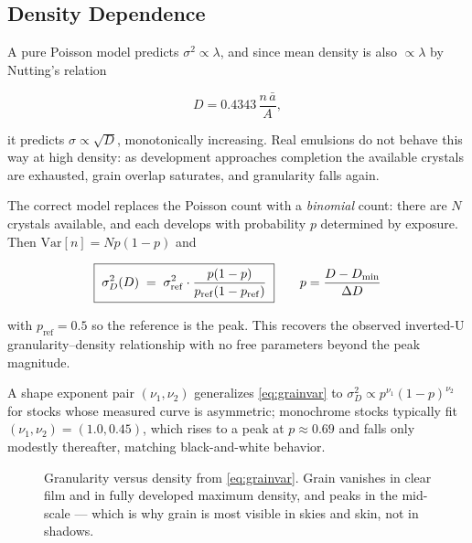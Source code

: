 \subsection{Density Dependence}

A pure Poisson model predicts $\sigma^2 \propto \lambda$, and since mean density
is also $\propto \lambda$ by Nutting's relation \cite{nutting1913}

\begin{equation}
D = 0.4343\,\frac{n\,\bar{a}}{A},
\end{equation}

it predicts $\sigma \propto \sqrt{D}$, monotonically increasing. Real emulsions
do not behave this way at high density: as development approaches completion the
available crystals are exhausted, grain overlap saturates, and granularity
falls again.

The correct model replaces the Poisson count with a \emph{binomial} count: there
are $N$ crystals available, and each develops with probability $p$ determined by
exposure. Then $\mathrm{Var}[n] = Np(1-p)$ and

\begin{equation}
\boxed{\;\sigma_D^2(D) \;=\; \sigma_{\mathrm{ref}}^2 \cdot \frac{p(1-p)}{p_{\mathrm{ref}}(1-p_{\mathrm{ref}})}\;}
\qquad p = \frac{D - D_{\min}}{\Delta D}
\label{eq:grainvar}
\end{equation}

with $p_{\mathrm{ref}} = 0.5$ so the reference is the peak. This recovers the
observed inverted-U granularity--density relationship with no free parameters
beyond the peak magnitude.

A shape exponent pair $(\nu_1, \nu_2)$ generalizes \eqref{eq:grainvar} to
$\sigma_D^2 \propto p^{\nu_1}(1-p)^{\nu_2}$ for stocks whose measured curve is
asymmetric; monochrome stocks typically fit $(\nu_1, \nu_2) = (1.0, 0.45)$,
which rises to a peak at $p \approx 0.69$ and falls only modestly thereafter,
matching black-and-white behavior.

\begin{figure}[htbp]
\centering
{}
\caption{Granularity versus density from \eqref{eq:grainvar}. Grain vanishes in clear film and in fully developed maximum density, and peaks in the mid-scale --- which is why grain is most visible in skies and skin, not in shadows.}
\label{fig:grainvar}
\end{figure}

